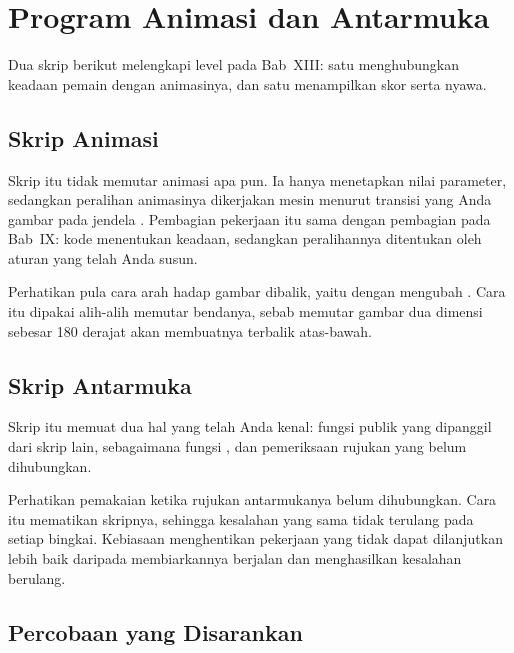 \section{Program Animasi dan Antarmuka}
\label{sec:program-aset}

Dua skrip berikut melengkapi level pada Bab~XIII: satu menghubungkan keadaan
pemain dengan animasinya, dan satu menampilkan skor serta nyawa.

\subsection{Skrip Animasi}


Skrip itu tidak memutar animasi apa pun. Ia hanya menetapkan
nilai parameter, sedangkan peralihan animasinya dikerjakan mesin menurut
transisi yang Anda gambar pada jendela . Pembagian pekerjaan
itu sama dengan pembagian pada Bab~IX: kode menentukan keadaan, sedangkan
peralihannya ditentukan oleh aturan yang telah Anda susun.

Perhatikan pula cara arah hadap gambar dibalik, yaitu dengan mengubah
. Cara itu dipakai alih-alih memutar bendanya,
sebab memutar gambar dua dimensi sebesar 180 derajat akan membuatnya terbalik
atas-bawah.

\subsection{Skrip Antarmuka}


Skrip itu memuat dua hal yang telah Anda kenal: fungsi publik yang dipanggil
dari skrip lain, sebagaimana fungsi , dan pemeriksaan rujukan
yang belum dihubungkan.

Perhatikan pemakaian  ketika rujukan antarmukanya belum
dihubungkan. Cara itu mematikan skripnya, sehingga kesalahan yang sama tidak
terulang pada setiap bingkai. Kebiasaan menghentikan pekerjaan yang tidak
dapat dilanjutkan lebih baik daripada membiarkannya berjalan dan
menghasilkan kesalahan berulang.

\subsection{Percobaan yang Disarankan}

